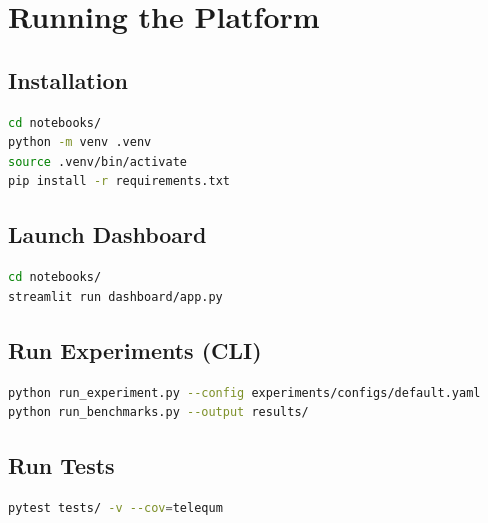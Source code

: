 \documentclass[11pt,a4paper]{article}
\begin{document}
\section{Running the Platform}

\subsection{Installation}

\begin{lstlisting}[language=bash]
cd notebooks/
python -m venv .venv
source .venv/bin/activate
pip install -r requirements.txt
\end{lstlisting}

\subsection{Launch Dashboard}

\begin{lstlisting}[language=bash]
cd notebooks/
streamlit run dashboard/app.py
\end{lstlisting}

\subsection{Run Experiments (CLI)}

\begin{lstlisting}[language=bash]
python run_experiment.py --config experiments/configs/default.yaml
python run_benchmarks.py --output results/
\end{lstlisting}

\subsection{Run Tests}

\begin{lstlisting}[language=bash]
pytest tests/ -v --cov=telequm
\end{lstlisting}
\end{document}
